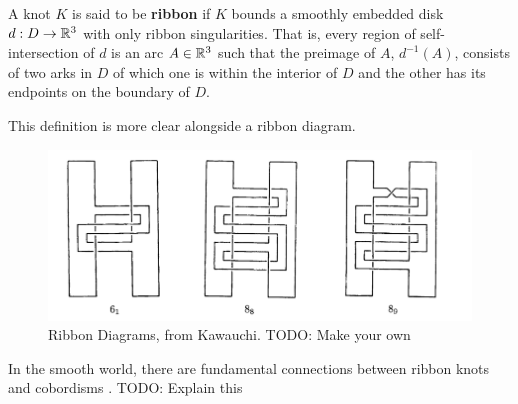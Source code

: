 \begin{definition}
    A knot $K$ is said to be \textbf{ribbon} if $K$ bounds a smoothly embedded disk $d: D \to \mathbb{R}^3$ with only ribbon singularities.
    That is, every region of self-intersection of $d$ is an arc $A \in \mathbb{R}^3$ such that the preimage of $A$, $d^{-1} (A)$, consists of two arks in $D$ of which one is within the interior of $D$ and the other has its endpoints on the boundary of $D$.
\end{definition}

This definition is more clear alongside a ribbon diagram.

\begin{figure}[ht!]
    \centering
    \includegraphics[width=0.8\linewidth]{images/ribbon-knots-kawauchi.png}
    \caption{Ribbon Diagrams, from Kawauchi. TODO: Make your own}%
    \label{fig:ribbon-knots-kawauchi}
\end{figure}

In the smooth world, there are fundamental connections between ribbon knots and cobordisms \cite{fox-milnor}. TODO: Explain this

